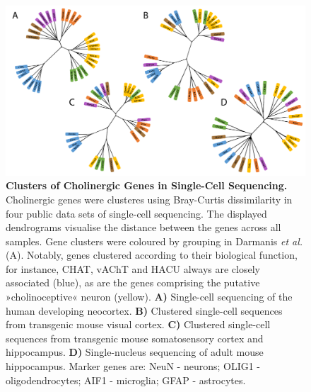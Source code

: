 \begin{figure}
\centering
\includegraphics[width=\textwidth]{figures/chol-clusters}
\caption[Clusters of Cholinergic Genes in Single-Cell Sequencing.]{\textbf{Clusters of Cholinergic Genes in Single-Cell Sequencing.} Cholinergic genes were clusteres using Bray-Curtis dissimilarity in four public data sets of single-cell sequencing. The displayed dendrograms visualise the distance between the genes across all samples. Gene clusters were coloured by grouping in Darmanis \emph{et al.}\cite{Darmanis2015} (A). Notably, genes clustered according to their biological function, for instance, CHAT, vAChT and HACU always are closely associated (blue), as are the genes comprising the putative »cholinoceptive« neuron (yellow). \textbf{A)} Single-cell sequencing of the human developing neocortex.\cite{Darmanis2015} \textbf{B)} Clustered single-cell sequences from transgenic mouse visual cortex.\cite{Tasic2016} \textbf{C)} Clustered single-cell sequences from transgenic mouse somatosensory cortex and hippocampus.\cite{Zeisel2015} \textbf{D)} Single-nucleus sequencing of adult mouse hippocampus.\cite{Habib2016} Marker genes are: NeuN - neurons; OLIG1 - oligodendrocytes; AIF1 - microglia; GFAP - astrocytes.
\label{fig:chol-clusters}}
\end{figure}
